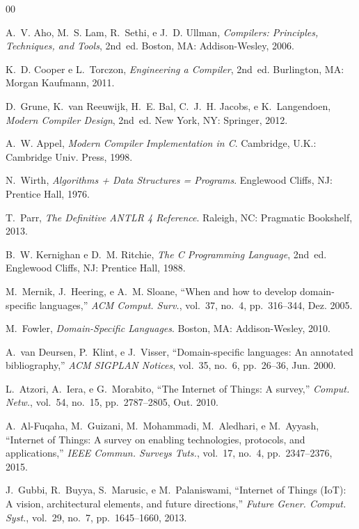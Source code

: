 \documentclass[conference]{IEEEtran}
\begin{document}
\balance
\begin{thebibliography}{00}

A.~V. Aho, M.~S. Lam, R.~Sethi, e J.~D. Ullman,
\textit{Compilers: Principles, Techniques, and Tools}, 2nd~ed.
Boston, MA: Addison-Wesley, 2006.

K.~D. Cooper e L.~Torczon,
\textit{Engineering a Compiler}, 2nd~ed.
Burlington, MA: Morgan Kaufmann, 2011.

D.~Grune, K.~van Reeuwijk, H.~E. Bal, C.~J.~H. Jacobs, e K.~Langendoen,
\textit{Modern Compiler Design}, 2nd~ed.
New York, NY: Springer, 2012.

A.~W. Appel,
\textit{Modern Compiler Implementation in C}.
Cambridge, U.K.: Cambridge Univ. Press, 1998.

N.~Wirth,
\textit{Algorithms + Data Structures = Programs}.
Englewood Cliffs, NJ: Prentice Hall, 1976.

T.~Parr,
\textit{The Definitive ANTLR 4 Reference}.
Raleigh, NC: Pragmatic Bookshelf, 2013.

B.~W. Kernighan e D.~M. Ritchie,
\textit{The C Programming Language}, 2nd~ed.
Englewood Cliffs, NJ: Prentice Hall, 1988.

M.~Mernik, J.~Heering, e A.~M. Sloane,
``When and how to develop domain-specific languages,''
\textit{ACM Comput. Surv.}, vol.~37, no.~4, pp.~316--344, Dez. 2005.

M.~Fowler,
\textit{Domain-Specific Languages}.
Boston, MA: Addison-Wesley, 2010.

A.~van Deursen, P.~Klint, e J.~Visser,
``Domain-specific languages: An annotated bibliography,''
\textit{ACM SIGPLAN Notices}, vol.~35, no.~6, pp.~26--36, Jun. 2000.

L.~Atzori, A.~Iera, e G.~Morabito,
``The Internet of Things: A survey,''
\textit{Comput. Netw.}, vol.~54, no.~15, pp.~2787--2805, Out. 2010.

A.~Al-Fuqaha, M.~Guizani, M.~Mohammadi, M.~Aledhari, e M.~Ayyash,
``Internet of Things: A survey on enabling technologies, protocols, and
applications,''
\textit{IEEE Commun. Surveys Tuts.}, vol.~17, no.~4, pp.~2347--2376, 2015.

J.~Gubbi, R.~Buyya, S.~Marusic, e M.~Palaniswami,
``Internet of Things (IoT): A vision, architectural elements, and future
directions,''
\textit{Future Gener. Comput. Syst.}, vol.~29, no.~7, pp.~1645--1660, 2013.


\end{thebibliography}
\end{document}
